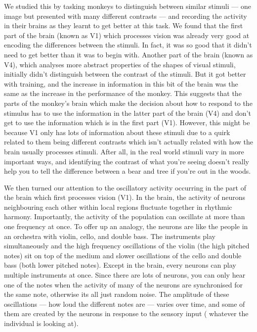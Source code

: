We studied this by tasking monkeys to distinguish between similar stimuli --- one image but presented with many different contrasts --- and recording the activity in their brains as they learnt to get better at this task.
We found that the first part of the brain (known as \acs{V1}) which processes vision was already very good at encoding the differences between the stimuli.
In fact, it was so good that it didn't need to get better than it was to begin with.
Another part of the brain (known as \acs{V4}), which analyses more abstract properties of the shapes of visual stimuli, initially didn't distinguish between the contrast of the stimuli.
But it got better with training, and the increase in information in this bit of the brain was the same as the increase in the performance of the monkey.
This suggests that the parts of the monkey's brain which make the decision about how to respond to the stimulus has to use the information in the latter part of the brain (\acs{V4}) and don't get to use the information which is in the first part (\acs{V1}).
However, this might be because \acs{V1} only has lots of information about these stimuli due to a quirk related to them being different contrasts which isn't actually related with how the brain usually processes stimuli.
After all, in the real world stimuli vary in more important ways, and identifying the contrast of what you're seeing doesn't really help you to tell the difference between a bear and tree if you're out in the woods.


We then turned our attention to the oscillatory activity occurring in the part of the brain which first processes vision (\acs{V1}).
In the brain, the activity of neurons neighbouring each other within local regions fluctuate together in rhythmic harmony.
Importantly, the activity of the population can oscillate at more than one frequency at once.
To offer up an analogy, the neurons are like the people in an orchestra with violin, cello, and double bass.
The instruments play simultaneously and the high frequency oscillations of the violin (the high pitched notes) sit on top of the medium and slower oscillations of the cello and double bass (both lower pitched notes).
Except in the brain, every neurons can play multiple instruments at once.
Since there are lots of neurons, you can only hear one of the notes when the activity of many of the neurons are synchronised for the same note, otherwise its all just random noise.
The amplitude of these oscillations --- how loud the different notes are --- varies over time, and some of them are created by the neurons in response to the sensory input (\ie{} whatever the individual is looking at).

